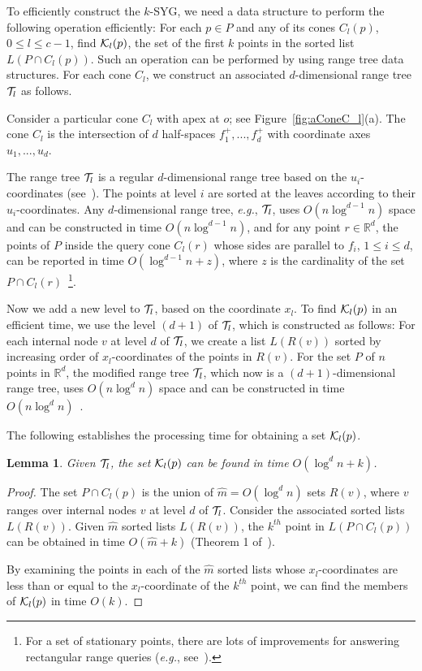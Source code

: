 \documentclass[preprint,12pt]{elsarticle}
\def\ksyg{\mbox{$k$-SYG}}
\newcommand{\eg}{\emph{e.g.}}
\newtheorem{lemma}{Lemma}[section]
\begin{document}
To efficiently construct the \ksyg, we need a data structure to perform the following operation efficiently: For each $p\in P$ and any of its cones $C_l(p)$, $0\leq l\leq c-1$, find ${\cal K}_l(p)$, the set of the first $k$ points in the sorted list $L(P\cap C_l(p))$. Such an operation can be performed by using range tree data structures. For each cone $C_l$, we construct an associated $d$-dimensional range tree ${\cal T}_l$ as follows.


Consider a particular cone $C_l$ with apex at $o$; see Figure~\ref{fig:aConeC_l}(a). The cone $C_l$ is the intersection of $d$ half-spaces $f^+_1,...,f^+_d$  with coordinate axes $u_1,...,u_d$.

The range tree ${\cal T}_l$ is a regular $d$-dimensional range tree based on the $u_i$-coordinates (see~\cite{Berg:2008:CGA:1370949}). The points at level $i$ are sorted at the leaves according to their $u_i$-coordinates. Any $d$-dimensional range tree, \eg, ${\cal T}_l$, uses $O(n\log^{d-1} n)$ space and can be constructed in time $O(n\log^{d-1} n)$, and for any point $r\in \mathbb{R}^d$, the points of $P$ inside the query cone $C_l(r)$ whose sides are parallel to $f_i$, $1\leq i\leq d$, can be reported in time $O(\log^{d-1} n + z)$, where $z$ is the cardinality of the set $P\cap C_l(r)$~\footnote{For a set of stationary points, there are lots of improvements for answering rectangular range queries (\eg, see~\cite{Chan:2011:ORS:1998196.1998198}).}.

Now we add a new level to ${\cal T}_l$, based on the coordinate $x_l$. To find ${\cal K}_l(p)$ in an efficient time, we use the level $(d+1)$ of ${\cal T}_l$, which is constructed as follows: For each internal node $v$ at level $d$ of ${\cal T}_l$, we create a list $L(R(v))$ sorted by increasing order of $x_l$-coordinates of the points in $R(v)$. For the set $P$ of $n$ points in $\mathbb{R}^d$, the modified range tree ${\cal T}_l$, which now is a $(d+1)$-dimensional range tree, uses $O(n\log^d n)$ space and can be constructed in time $O(n\log^d n)$~\cite{Berg:2008:CGA:1370949}.
 
The following establishes the processing time for obtaining a set ${\cal K}_l(p)$. 

\begin{lemma}\label{the:SortingLists}
Given ${\cal T}_l$, the set ${\cal K}_l(p)$ can be found in time $O(\log^d n+k)$.
\end{lemma}
\begin{proof}
The set $P\cap C_l(p)$ is the union of $\hat{m}=O(\log^d n)$ sets $R(v)$, where $v$ ranges over internal nodes $v$ at level $d$ of ${\cal T}_l$. Consider the associated sorted lists $L(R(v))$. Given $\hat{m}$ sorted lists $L(R(v))$, the $k^{th}$ point in $L(P\cap C_l(p))$ can be obtained in time $O(\hat{m}+k)$ (Theorem 1 of~\cite{Frederickson1982197}). 

By examining the points in each of the $\hat{m}$ sorted lists whose $x_l$-coordinates are less than or equal to the $x_l$-coordinate of the $k^{th}$ point, we can find the members of ${\cal K}_l(p)$  in time $O(k)$.
\end{proof}
\end{document}
